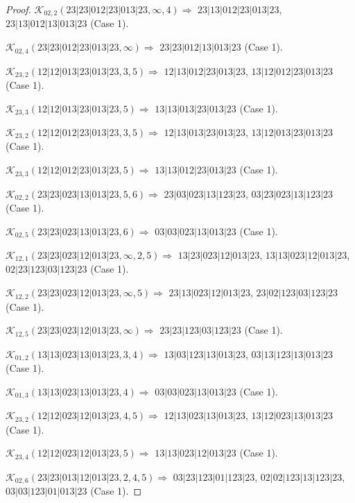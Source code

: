 \documentclass[12pt]{article}
\theoremstyle{plain}
\theoremstyle{definition}
\theoremstyle{remark}
\newcommand{\fancy}[1]{\mathcal{#1}}
\def\K{\fancy{K}}
\begin{document}
\begin{proof}
	$\K_{02,2}(23|23|012|23|013|23,\infty,4)\Rightarrow $ $23|13|012|23|013|23$, $23|13|012|13|013|23$ (Case 1).
	
	$\K_{02,4}(23|23|012|23|013|23,\infty)\Rightarrow $ $23|23|012|13|013|23$ (Case 1).
	
	
	\bigskip
	
	$\K_{23,2}(12|12|013|23|013|23,3, 5)\Rightarrow $ $12|13|012|23|013|23$, $13|12|012|23|013|23$ (Case 1).
	
	$\K_{23,3}(12|12|013|23|013|23,5)\Rightarrow $ $13|13|013|23|013|23$ (Case 1).
	
	
	\bigskip
	
	$\K_{23,2}(12|12|012|23|013|23,3, 5)\Rightarrow $ $12|13|013|23|013|23$, $13|12|013|23|013|23$ (Case 1).
	
	$\K_{23,3}(12|12|012|23|013|23,5)\Rightarrow $ $13|13|012|23|013|23$ (Case 1).
	
	
	\bigskip
	
	$\K_{02,2}(23|23|023|13|013|23,5, 6)\Rightarrow $ $23|03|023|13|123|23$, $03|23|023|13|123|23$ (Case 1).
	
	$\K_{02,5}(23|23|023|13|013|23,6)\Rightarrow $ $03|03|023|13|013|23$ (Case 1).
	
	
	\bigskip
	
	$\K_{12,1}(23|23|023|12|013|23,\infty,2, 5)\Rightarrow $ $13|23|023|12|013|23$, $13|13|023|12|013|23$, $02|23|123|03|123|23$ (Case 1).
	
	$\K_{12,2}(23|23|023|12|013|23,\infty,5)\Rightarrow $ $23|13|023|12|013|23$, $23|02|123|03|123|23$ (Case 1).
	
	$\K_{12,5}(23|23|023|12|013|23,\infty)\Rightarrow $ $23|23|123|03|123|23$ (Case 1).
	
	
	\bigskip
	
	$\K_{01,2}(13|13|023|13|013|23,3, 4)\Rightarrow $ $13|03|123|13|013|23$, $03|13|123|13|013|23$ (Case 1).
	
	$\K_{01,3}(13|13|023|13|013|23,4)\Rightarrow $ $03|03|023|13|013|23$ (Case 1).
	
	
	\bigskip
	
	$\K_{23,2}(12|12|023|12|013|23,4, 5)\Rightarrow $ $12|13|023|13|013|23$, $13|12|023|13|013|23$ (Case 1).
	
	$\K_{23,4}(12|12|023|12|013|23,5)\Rightarrow $ $13|13|023|12|013|23$ (Case 1).
	
	
	\bigskip
	
	$\K_{02,6}(23|23|013|12|013|23,2, 4, 5)\Rightarrow $ $03|23|123|01|123|23$, $02|02|123|13|123|23$, $03|03|123|01|013|23$ (Case 1).
	

\end{proof}
\end{document}
